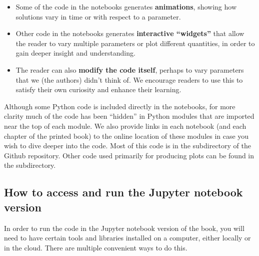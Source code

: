 \documentclass{SIAMbook2016}
\providecommand{\tightlist}{%
      \setlength{\itemsep}{0pt}\setlength{\parskip}{0pt}}
\begin{document}
\begin{itemize}
\tightlist
\item
  Some of the code in the notebooks generates \textbf{animations},
  showing how solutions vary in time or with respect to a parameter.
\item
  Other code in the notebooks generates \textbf{interactive ``widgets''}
  that allow the reader to vary multiple parameters or plot different
  quantities, in order to gain deeper insight and understanding.
\item
  The reader can also \textbf{modify the code itself}, perhaps to vary
  parameters that we (the authors) didn't think of. We encourage readers
  to use this to satisfy their own curiosity and enhance their learning.
\end{itemize}

Although some Python code is included directly in the notebooks, for
more clarity much of the code has been ``hidden'' in Python modules that
are imported near the top of each module. We also provide links in each
notebook (and each chapter of the printed book) to the online location
of these modules in case you wish to dive deeper into the code. Most of
this code is in the
subdirectory of the Github repository. Other code used primarily for
producing plots can be found in the
subdirectory.

\hypertarget{how-to-access-and-run-the-jupyter-notebook-version}{%
\subsection{How to access and run the Jupyter notebook
version}\label{how-to-access-and-run-the-jupyter-notebook-version}}

In order to run the code in the Jupyter notebook version of the book,
you will need to have certain tools and libraries installed on a
computer, either locally or in the cloud. There are multiple convenient
ways to do this.
\end{document}
